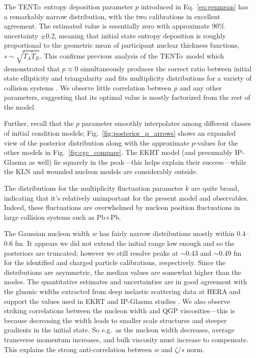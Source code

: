 \documentclass[aps,prc,reprint,amsmath,nofootinbib]{revtex4-1}
\newcommand{\trento}{T\raisebox{-0.5ex}{R}ENTo}
\newcommand{\T}{\tilde{T}}
\begin{document}
The \trento\ entropy deposition parameter $p$ introduced in Eq.~\eqref{eq:genmean} has a remarkably narrow distribution, with the two calibrations in excellent agreement.
The estimated value is essentially zero with approximate 90\% uncertainty $\pm0.2$, meaning that initial state entropy deposition is roughly proportional to the geometric mean of participant nuclear thickness functions, $s \sim \sqrt{\T_A\T_B}$.
This confirms previous analysis of the \trento\ model which demonstrated that $p \approx 0$ simultaneously produces the correct ratio between initial state ellipticity and triangularity and fits multiplicity distributions for a variety of collision systems \cite{Moreland:2014oya}.
We observe little correlation between $p$ and any other parameters, suggesting that its optimal value is mostly factorized from the rest of the model.

Further, recall that the $p$ parameter smoothly interpolates among different classes of initial condition models;
Fig.~\ref{fig:posterior_p_arrows} shows an expanded view of the posterior distribution along with the approximate $p$-values for the other models in Fig.~\ref{fig:cgc_compare}.
The EKRT model (and presumably IP-Glasma as well) lie squarely in the peak---this helps explain their success---while the KLN and wounded nucleon models are considerably outside.

The distributions for the multiplicity fluctuation parameter $k$ are quite broad, indicating that it's relatively unimportant for the present model and observables.
Indeed, these fluctuations are overwhelmed by nucleon position fluctuations in large collision systems such as Pb+Pb.

The Gaussian nucleon width $w$ has fairly narrow distributions mostly within 0.4--0.6 fm.
It appears we did not extend the initial range low enough and so the posteriors are truncated;
however we still resolve peaks at ${\sim}0.43$ and ${\sim}0.49$ fm for the identified and charged particle calibrations, respectively.
Since the distributions are asymmetric, the median values are somewhat higher than the modes.
The quantitative estimates and uncertainties are in good agreement with the gluonic widths extracted from deep inelastic scattering data at HERA \cite{Chekanov:2004mw, Kowalski:2006hc, Rezaeian:2012ji} and support the values used in EKRT and IP-Glasma studies \cite{Niemi:2015qia, Schenke:2012wb}.
We also observe striking correlations between the nucleon width and QGP viscosities---this is because decreasing the width leads to smaller scale structures and steeper gradients in the initial state.
So e.g.\ as the nucleon width decreases, average transverse momentum increases, and bulk viscosity must increase to compensate.
This explains the strong anti-correlation between $w$ and $\zeta/s$ norm.
\end{document}
